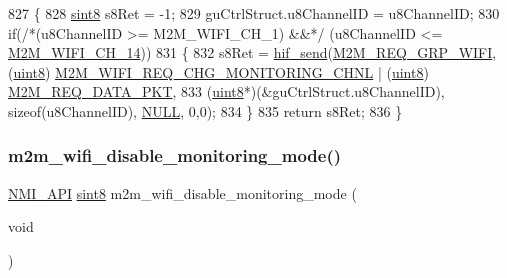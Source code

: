 \begin{DoxyCode}
827 \{
828     \hyperlink{group__DataT_gae35f10ffd0ac8dd2bc3e794da9bdfbc7}{sint8}  s8Ret = -1;
829     guCtrlStruct.u8ChannelID = u8ChannelID;
830     \textcolor{keywordflow}{if}(\textcolor{comment}{/*(u8ChannelID >= M2M\_WIFI\_CH\_1) &&*/} (u8ChannelID <= \hyperlink{group__WlanEnums_gga2a91dd671e2672dba1a7ed45230f3a99a6421cfaf77ed29e91106d39e69e4a970}{M2M\_WIFI\_CH\_14}))
831     \{       
832         s8Ret = \hyperlink{m2m__hif_8c_a13ba8ad11b2ac39516ca787386d16ce0}{hif\_send}(\hyperlink{nm__common_8h_a9ab02eb1aea02a75c3f5aade4eef1276aeb9a7d57324ba4b8a6c2a5f46dd499c2}{M2M\_REQ\_GRP\_WIFI}, (\hyperlink{group__DataT_ga4df709a77647e870bbf1d955b8edc9a6}{uint8})
      \hyperlink{group__WlanEnums_gga064de09dec1d5e88ed8d075fa40f57dea6ec4ad7e22372a7ae59eb2a72523211e}{M2M\_WIFI\_REQ\_CHG\_MONITORING\_CHNL} | (\hyperlink{group__DataT_ga4df709a77647e870bbf1d955b8edc9a6}{uint8})
      \hyperlink{nm__common_8h_a8f14623395b4e817613140afdf87fe6fa4ba55ee3c10f0b8175bba12f4b39a499}{M2M\_REQ\_DATA\_PKT},
833             (\hyperlink{group__DataT_ga4df709a77647e870bbf1d955b8edc9a6}{uint8}*)(&guCtrlStruct.u8ChannelID), \textcolor{keyword}{sizeof}(u8ChannelID), \hyperlink{group__BSPDefine_ga070d2ce7b6bb7e5c05602aa8c308d0c4}{NULL}, 0,0);
834     \}
835     \textcolor{keywordflow}{return} s8Ret;
836 \}
\end{DoxyCode}
\mbox{\label{group__WifiDisableMonitorModeFn_ga22d6c3d2f63fceac652835994cb15594}} 
\subsubsection{\texorpdfstring{m2m\+\_\+wifi\+\_\+disable\+\_\+monitoring\+\_\+mode()}{m2m\_wifi\_disable\_monitoring\_mode()}}
{\footnotesize\ttfamily \hyperlink{group__BSPDefine_gaecc0323d771e41ef81a76b5f12783e22}{N\+M\+I\+\_\+\+A\+PI} \hyperlink{group__DataT_gae35f10ffd0ac8dd2bc3e794da9bdfbc7}{sint8} m2m\+\_\+wifi\+\_\+disable\+\_\+monitoring\+\_\+mode (\begin{DoxyParamCaption}\item[{void}]{ }\end{DoxyParamCaption})}




